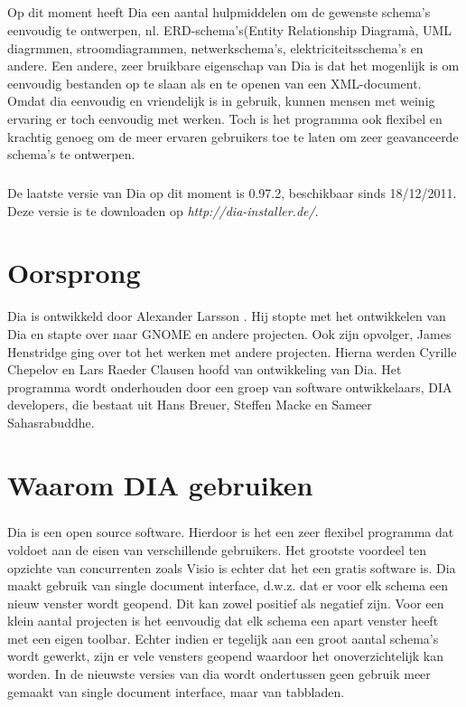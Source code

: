\documentclass[12pt,a4paper]{report}
\begin{document}
\begin{flushleft}
\paragraph*{}
Op dit moment heeft Dia een aantal hulpmiddelen om de gewenste schema's eenvoudig te ontwerpen, nl. ERD-schema's(Entity Relationship Diagramà, UML diagrmmen, stroomdiagrammen, netwerkschema's, elektriciteitsschema's en andere. Een andere, zeer bruikbare eigenschap van Dia is dat het mogenlijk is om eenvoudig bestanden op te slaan als en te openen van een XML-document.
Omdat dia eenvoudig en vriendelijk is in gebruik, kunnen mensen met weinig ervaring er toch eenvoudig met werken. Toch is het programma ook flexibel en krachtig genoeg om de meer ervaren gebruikers toe te laten om zeer geavanceerde schema's te ontwerpen.
\paragraph*{}
De laatste versie van Dia op dit moment is 0.97.2, beschikbaar sinds 18/12/2011. Deze versie is te downloaden op \textit{http://dia-installer.de/}.

\chapter*{Oorsprong}
Dia is ontwikkeld door Alexander Larsson . Hij stopte met het ontwikkelen van Dia en stapte over naar GNOME en andere projecten. Ook zijn opvolger, James Henstridge ging over tot het werken met andere projecten. Hierna werden Cyrille Chepelov en Lars Raeder Clausen hoofd van ontwikkeling van Dia. Het programma wordt onderhouden door een groep van software ontwikkelaars, DIA developers, die bestaat uit Hans Breuer, Steffen Macke en Sameer Sahasrabuddhe.

\chapter*{Waarom DIA gebruiken}
\paragraph*{}
Dia is een open source software. Hierdoor is het een zeer flexibel programma dat voldoet aan de eisen van verschillende gebruikers. Het grootste voordeel ten opzichte van concurrenten zoals Visio is echter dat het een gratis software is. Dia maakt gebruik van single document interface, d.w.z. dat er voor elk schema een nieuw venster wordt geopend. Dit kan zowel positief als negatief zijn. Voor een klein aantal projecten is het eenvoudig dat elk schema een apart venster heeft met een eigen toolbar. Echter indien er tegelijk aan een groot aantal schema's wordt gewerkt, zijn er vele vensters geopend waardoor het onoverzichtelijk kan worden. In de nieuwste versies van dia wordt ondertussen geen gebruik meer gemaakt van single document interface, maar van tabbladen.

\end{flushleft}
\end{document}
